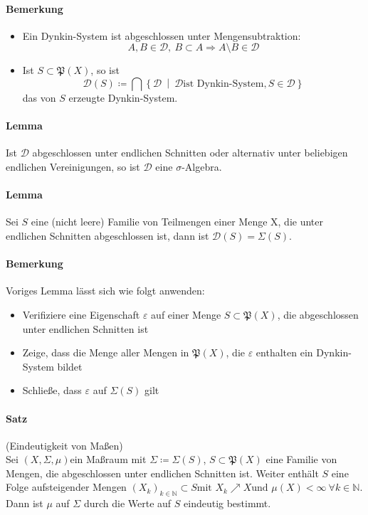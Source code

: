 \documentclass[12pt,a4paper,fleqn]{article}
\def\set#1{{\left\{ #1 \right\}}}
\def\Mid{\ \middle|\ }
\begin{document}
\paragraph{Bemerkung}
\begin{itemize}
\item Ein Dynkin-System ist abgeschlossen unter Mengensubtraktion:
\begin{displaymath}
A, B \in \mathcal{D},\ B \subset A \Rightarrow A \setminus B \in \mathcal{D}
\end{displaymath}
\item Ist $S \subset \mathfrak{P}(X)$, so ist
\begin{displaymath}
\mathcal{D}(S) \coloneqq \bigcap \set{\mathcal{D}\Mid \mathcal{D}  \text{ist Dynkin-System}, S \in \mathcal{D}}
\end{displaymath}
das von $S$ erzeugte Dynkin-System.
\end{itemize}

\paragraph{Lemma} Ist $\mathcal{D}$ abgeschlossen unter endlichen Schnitten oder alternativ unter beliebigen endlichen Vereinigungen, so ist $\mathcal{D}$ eine $\sigma$-Algebra.

\paragraph{Lemma} Sei $S$ eine (nicht leere) Familie von Teilmengen einer Menge X, die unter endlichen Schnitten abgeschlossen ist, dann ist $\mathcal{D}(S) = \Sigma(S)$.

\paragraph{Bemerkung} Voriges Lemma lässt sich wie folgt anwenden:
\begin{itemize}
\item Verifiziere eine Eigenschaft $\varepsilon$ auf einer Menge $S \subset \mathfrak{P}(X)$, die abgeschlossen unter endlichen Schnitten ist
\item Zeige, dass die Menge aller Mengen in $\mathfrak{P}(X)$, die $\varepsilon$ enthalten ein Dynkin-System bildet
\item Schließe, dass $\varepsilon$ auf $\Sigma(S)$ gilt
\end{itemize} 

\paragraph{Satz}(Eindeutigkeit von Maßen)\\
Sei $(X, \Sigma, \mu)$ein Maßraum mit $\Sigma \coloneqq \Sigma(S)$, $S \subset \mathfrak{P}(X)$ eine Familie von Mengen, die abgeschlossen unter endlichen Schnitten ist. Weiter enthält $S$ eine Folge aufsteigender Mengen $(X_k)_{k \in \mathbb{N}} \subset S \text{mit } X_k \nearrow X \text{und } \mu(X) < \infty \ \forall k \in \mathbb{N}$. Dann ist $\mu$ auf $\Sigma$ durch die Werte auf $S$ eindeutig bestimmt.
\end{document}
